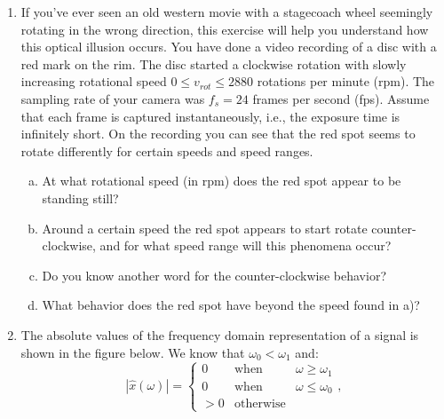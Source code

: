 \begin{enumerate}
\item If you've ever seen an old western movie with a stagecoach wheel seemingly rotating in the wrong direction, this exercise will help you understand how this optical illusion occurs. You have done a video recording of a disc with a red mark on the rim. The disc started a clockwise rotation with slowly increasing rotational speed $0 \le v_{rot} \le 2880$ rotations per minute (rpm). The sampling rate of your camera was $f_s = 24$ frames per second (fps). Assume that each frame is captured instantaneously, i.e., the exposure time is infinitely short. On the recording you can see that the red spot seems to rotate differently for certain speeds and speed ranges.
  \begin{enumerate}[a)]
    \item At what rotational speed (in rpm) does the red spot appear to be standing still?
    \item Around a certain speed the red spot appears to start rotate counter-clockwise, and for what speed range will this phenomena occur?
    \item Do you know another word for the counter-clockwise behavior?
    \item What behavior does the red spot have beyond the speed found in a)?
  \end{enumerate}
\item The absolute values of the frequency domain representation of a signal is shown in the figure below. We know that $\omega_{0}<\omega_{1}$ and:
  \begin{equation}
    |\hat{x}(\omega)| = \left\{\begin{array}{ccc}
    0 & \mathrm{when} & \omega \ge \omega_1\\
    0 & \mathrm{when} & \omega \le \omega_0\\
    >0 & \mathrm{otherwise} &
    \end{array}\right.,
    \end{equation}
\begin{center}
\end{center}
\end{enumerate}
